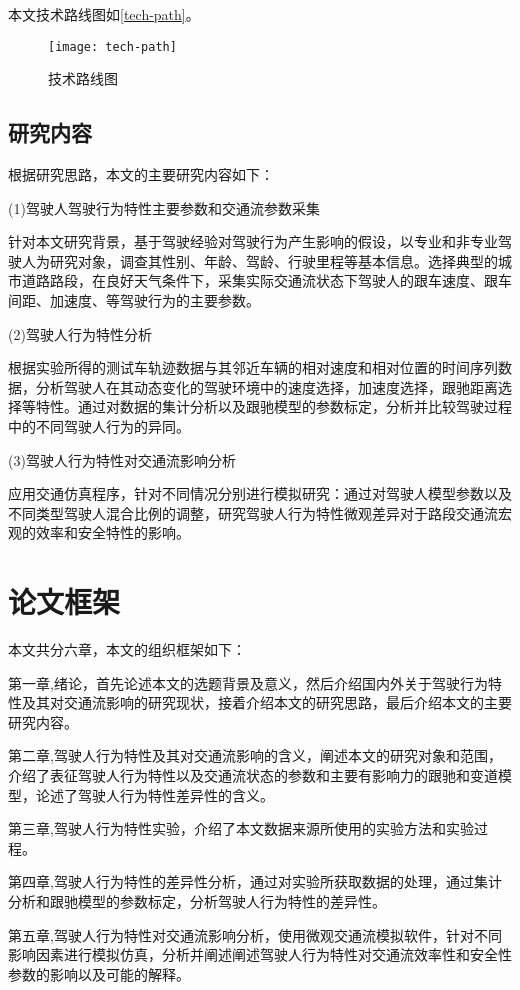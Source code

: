 本文技术路线图如\autoref{tech-path}。

\begin{figure}[htpb]
	\centering
	\texttt{[image: tech-path]}
	\caption{技术路线图}
	\label{tech-path}
\end{figure}

\subsection{研究内容}
根据研究思路，本文的主要研究内容如下：

(1)驾驶人驾驶行为特性主要参数和交通流参数采集

针对本文研究背景，基于驾驶经验对驾驶行为产生影响的假设，以专业和非专业驾驶人为研究对象，调查其性别、年龄、驾龄、行驶里程等基本信息。选择典型的城市道路路段，在良好天气条件下，采集实际交通流状态下驾驶人的跟车速度、跟车间距、加速度、等驾驶行为的主要参数。

(2)驾驶人行为特性分析

根据实验所得的测试车轨迹数据与其邻近车辆的相对速度和相对位置的时间序列数据，分析驾驶人在其动态变化的驾驶环境中的速度选择，加速度选择，跟驰距离选择等特性。通过对数据的集计分析以及跟驰模型的参数标定，分析并比较驾驶过程中的不同驾驶人行为的异同。

(3)驾驶人行为特性对交通流影响分析

应用交通仿真程序，针对不同情况分别进行模拟研究：通过对驾驶人模型参数以及不同类型驾驶人混合比例的调整，研究驾驶人行为特性微观差异对于路段交通流宏观的效率和安全特性的影响。


\section{论文框架}
本文共分六章，本文的组织框架如下：

第一章,绪论，首先论述本文的选题背景及意义，然后介绍国内外关于驾驶行为特性及其对交通流影响的研究现状，接着介绍本文的研究思路，最后介绍本文的主要研究内容。

第二章,驾驶人行为特性及其对交通流影响的含义，阐述本文的研究对象和范围，介绍了表征驾驶人行为特性以及交通流状态的参数和主要有影响力的跟驰和变道模型，论述了驾驶人行为特性差异性的含义。

第三章,驾驶人行为特性实验，介绍了本文数据来源所使用的实验方法和实验过程。

第四章,驾驶人行为特性的差异性分析，通过对实验所获取数据的处理，通过集计分析和跟驰模型的参数标定，分析驾驶人行为特性的差异性。

第五章,驾驶人行为特性对交通流影响分析，使用微观交通流模拟软件，针对不同影响因素进行模拟仿真，分析并阐述阐述驾驶人行为特性对交通流效率性和安全性参数的影响以及可能的解释。

